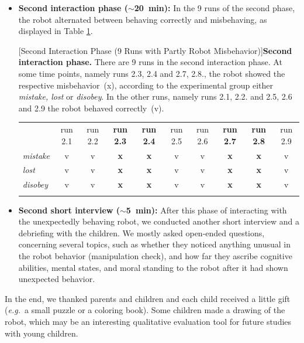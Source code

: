 \documentclass{sig-alternate}
\newcommand{\eg}{{\textit{e.g.~}}}
\begin{document}
\begin{itemize}
    \item \textbf{Second interaction phase ($\sim$20~min):} In the 9 runs of the
        second phase, the robot alternated between behaving correctly and
        misbehaving, as displayed in Table \ref{tab:domino-second}.
	
\begin{table}[H]
[Second Interaction Phase (9 Runs with Partly Robot Misbehavior)]{\small \textbf{Second interaction phase.} There are 9 runs in the second interaction phase. At some time points, namely runs 2.3, 2.4 and 2.7, 2.8., the robot showed the respective misbehavior~(x), according to the experimental group either \textit{mistake, lost} or \textit{disobey}. In the other runs, namely runs 2.1, 2.2. and 2.5, 2.6 and 2.9 the robot behaved correctly~(v).}
\label{tab:domino-second}       %
\centering
\footnotesize
\begin{tabular}{lccccccccc}
\noalign{\smallskip}\noalign{\smallskip}\hline\noalign{\smallskip}
	&  run 2.1 & run 2.2 & \textbf{run 2.3} & \textbf{run 2.4} & run 2.5 & run 2.6 & \textbf{run 2.7} & \textbf{run 2.8} & run 2.9 \\ 
\noalign{\smallskip}\hline\hline
	\textit{mistake} & v & v & \textbf{x} & \textbf{x} & v & v & \textbf{x} & \textbf{x} & v \\ 
	\textit{lost} & v & v & \textbf{x} & \textbf{x} & v & v & \textbf{x} & \textbf{x} & v \\ 
	\textit{disobey} & v & v & \textbf{x} & \textbf{x} & v & v & \textbf{x} & \textbf{x} & v \\
\noalign{\smallskip}\hline
\end{tabular}
\end{table}

    \item \textbf{Second short interview ($\sim$5~min):} After this phase of
        interacting with the unexpectedly behaving robot, we conducted another
        short interview and a debriefing with the children. We mostly asked
        open-ended questions, concerning several topics, such as whether they
        noticed anything unusual in the robot behavior (manipulation check), and
        how far they ascribe cognitive abilities, mental states, and moral
        standing to the robot after it had shown unexpected behavior.  

\end{itemize}

In the end, we thanked parents and children and each child received a little
gift (\eg a small puzzle or a coloring book). Some children made a drawing of
the robot, which may be an interesting qualitative evaluation tool for future
studies with young children.
\end{document}
